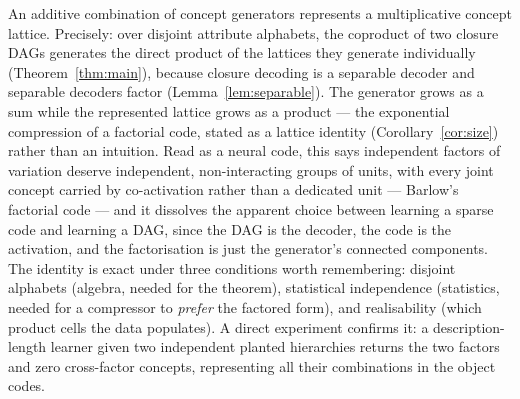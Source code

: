 \documentclass[11pt]{article}
\theoremstyle{definition}
\theoremstyle{plain}
\theoremstyle{remark}
\begin{document}
An additive combination of concept generators represents a multiplicative concept
lattice. Precisely: over disjoint attribute alphabets, the coproduct of two
closure DAGs generates the direct product of the lattices they generate
individually (Theorem~\ref{thm:main}), because closure decoding is a separable
decoder and separable decoders factor (Lemma~\ref{lem:separable}). The generator
grows as a sum while the represented lattice grows as a product --- the exponential
compression of a factorial code, stated as a lattice identity
(Corollary~\ref{cor:size}) rather than an intuition. Read as a neural code, this
says independent factors of variation deserve independent, non-interacting groups
of units, with every joint concept carried by co-activation rather than a
dedicated unit --- Barlow's factorial code --- and it dissolves the apparent choice
between learning a sparse code and learning a DAG, since the DAG is the decoder,
the code is the activation, and the factorisation is just the generator's
connected components. The identity is exact under three conditions worth
remembering: disjoint alphabets (algebra, needed for the theorem), statistical
independence (statistics, needed for a compressor to \emph{prefer} the factored
form), and realisability (which product cells the data populates). A direct
experiment confirms it: a description-length learner given two independent planted
hierarchies returns the two factors and zero cross-factor concepts, representing
all their combinations in the object codes.



\end{document}
